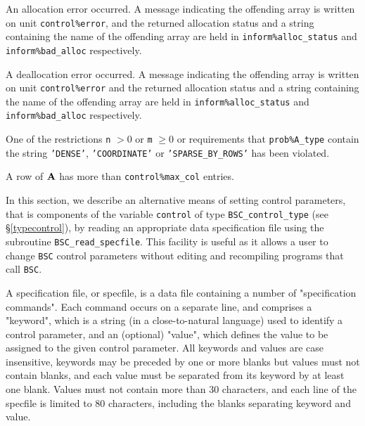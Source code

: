 \documentclass{galahad}
\newcommand{\packagename}{BSC}
\begin{document}
\begin{description}

 An allocation error occurred.
A message indicating the offending
array is written on unit {\tt control\%error}, and the returned allocation
status and a string containing the name of the offending array
are held in {\tt inform\%alloc\_\-status}
and {\tt inform\%bad\_alloc} respectively.

 A deallocation error occurred.
A message indicating the offending
array is written on unit {\tt control\%error} and the returned allocation
status and a string containing the name of the offending array
are held in {\tt inform\%alloc\_\-status}
and {\tt inform\%bad\_alloc} respectively.

 One of the restrictions
   {\tt n} $> 0$ or {\tt m} $\geq  0$
    or requirements that {\tt prob\%A\_type}
    contain the string
    {\tt 'DENSE'}, {\tt 'COORDINATE'} or {\tt 'SPARSE\_BY\_ROWS'}
    has been violated.

\itt{\galerrschurcomplement}
A row of ${\mathbf{A}}$ has more than {\tt control\%max\_col} entries.

\end{description}


\galfeatures
\noindent In this section, we describe an alternative means of setting
control parameters, that is components of the variable {\tt control} of type
{\tt \packagename\_control\_type}
(see \S\ref{typecontrol}),
by reading an appropriate data specification file using the
subroutine {\tt \packagename\_read\_specfile}. This facility
is useful as it allows a user to change  {\tt \packagename} control parameters
without editing and recompiling programs that call {\tt \packagename}.

A specification file, or specfile, is a data file containing a number of
"specification commands". Each command occurs on a separate line,
and comprises a "keyword",
which is a string (in a close-to-natural language) used to identify a
control parameter, and
an (optional) "value", which defines the value to be assigned to the given
control parameter. All keywords and values are case insensitive,
keywords may be preceded by one or more blanks but
values must not contain blanks, and
each value must be separated from its keyword by at least one blank.
Values must not contain more than 30 characters, and
each line of the specfile is limited to 80 characters,
including the blanks separating keyword and value.
\end{document}
